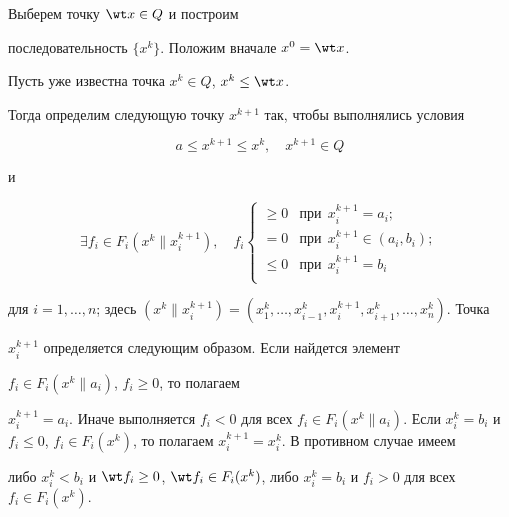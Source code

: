\begin{pf}


Выберем точку $\wt x \in Q$ и построим


последовательность $\{x^{k}\}$. Положим вначале $x^0 = \wt x$.


Пусть уже известна точка $x^k \in Q$, $x^k \le \wt x$.


Тогда определим следующую точку $x^{k+1}$ так, чтобы выполнялись условия


\begin{equation}\label{eq:8}


a \le x^{k+1} \le x^k, \quad x^{k+1} \in Q


\end{equation}


и


\begin{equation}\label{eq:9}


\exists f_i \in F_i (x^k \| x^{k+1}_i), \quad f_i 


\begin{cases}


\ge 0 & \text{при} \ \ x^{k+1}_i = a_i;\\


=0 & \text{при} \ \ x^{k+1}_i \in (a_i,b_i);\\


\le 0 & \text{при} \ \ x^{k+1}_i = b_i\\


\end{cases}


\end{equation}


для $i=1,\dotsc,n$; здесь $(x^k \| x^{k+1}_i)  =


(x^k_1,\dotsc,x^k_{i-1},x^{k+1}_i,x^k_{i+1},\dotsc,x^k_n)$. Точка


$x_i^{k+1}$ определяется следующим образом. Если найдется элемент


$f_i \in F_i (x^k \| a_i)$, $ f_i \ge 0$, то полагаем


$x^{k+1}_i=a_i$. Иначе выполняется $f_i<0$ для всех $ f_i \in


F_i(x^k \| a_i)$. Если $x^k_i=b_i$ и $f_i \le 0$, $ f_i \in F_i


(x^k)$, то полагаем $x^{k+1}_i=x^k_i$. В противном случае имеем


либо $x^k_i<b_i$ и $\wt f_i \ge 0$, $ \wt f_i \in F_i


(x^k)$, либо $x^k_i=b_i$ и $f_i>0$ для всех $f_i \in F_i(x^k)$.



\end{pf}
